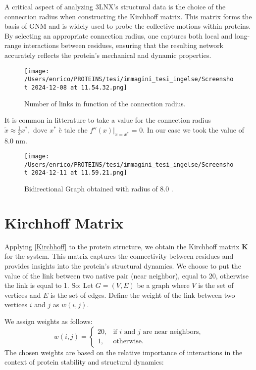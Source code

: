 \documentclass[English, Lau, oneside]{sapthesis}
\begin{document}
\noindent A critical aspect of analyzing 3LNX’s structural data is the choice of the connection radius when constructing the Kirchhoff matrix. 
This matrix forms the basis of GNM and is widely used to probe the collective motions within proteins.
By selecting an appropriate connection radius, one captures both local and long-range interactions between residues, ensuring that the resulting network accurately reflects the protein’s mechanical and dynamic properties.

\begin{figure}[h!]
    \centering
    \texttt{[image: /Users/enrico/PROTEINS/tesi/immagini\_tesi\_ingelse/Screenshot 2024-12-08 at 11.54.32.png]}
    \caption{ Number of links in function of the connection radius.}
\end{figure}

It is common in litterature to take a value for the connection radius $\tilde{x} \approx \frac{1}{2} x^*, \text{ dove } x^* \text{ è tale che } f''(x) \big|_{x = x^*}$ = 0. In our case we took the value of 8.0 nm.\\
\begin{figure}[h!]
    \centering
    \texttt{[image: /Users/enrico/PROTEINS/tesi/immagini\_tesi\_ingelse/Screenshot 2024-12-11 at 11.59.21.png]}
    \caption{Bidirectional Graph obtained with radius of 8.0 .}
\end{figure}


\newpage
\section{Kirchhoff Matrix}\label{Kirchhoff_paragraph}
\noindent Applying \eqref{Kirchhoff} to the protein structure, we obtain the Kirchhoff matrix \(\mathbf{K}\) for the system. This matrix captures the connectivity between residues and provides insights into the protein's structural dynamics. 
We choose to put the value of the link between two native pair (near neighbor), equal to 20, otherwise the link is equal to 1.
So:
Let \( G = (V, E) \) be a graph where \( V \) is the set of vertices and \( E \) is the set of edges. Define the weight of the link between two vertices \( i \) and \( j \) as \( w(i, j) \).

We assign weights as follows:
\[
w(i, j) =
\begin{cases}
20, & \text{if } i \text{ and } j \text{ are near neighbors}, \\
1, & \text{otherwise}.
\end{cases}
\]
The chosen weights are based on the relative importance of interactions in the context of protein stability and structural dynamics:
\end{document}
